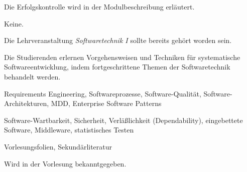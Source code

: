 \begin{course}

\setdoclanguagegerman
{}



\coursehead


\label{cour_7361.dp_997}


\begin{styleenv}
\begin{assessment}
Die Erfolgskontrolle wird in der Modulbeschreibung erläutert.


\end{assessment}

\begin{conditions}Keine.\end{conditions}

\begin{recommendations}Die Lehrveranstaltung \emph{Softwaretechnik I} sollte bereits gehört worden sein.

\end{recommendations}
\end{styleenv}

\begin{learningoutcomes}
Die Studierenden erlernen Vorgehensweisen und Techniken für systematische Softwareentwicklung, indem fortgeschrittene Themen der Softwaretechnik behandelt werden.


\end{learningoutcomes}

\begin{content}
Requirements Engineering, Softwareprozesse, Software-Qualität, Software-Architekturen, MDD, Enterprise Software Patterns

 

Software-Wartbarkeit, Sicherheit, Verläßlichkeit (Dependability), eingebettete Software, Middleware, statistisches Testen


\end{content}

\begin{media}Vorlesungsfolien, Sekundärliteratur

\end{media}

\begin{literature}Wird in der Vorlesung bekanntgegeben.

\end{literature}



\end{course}